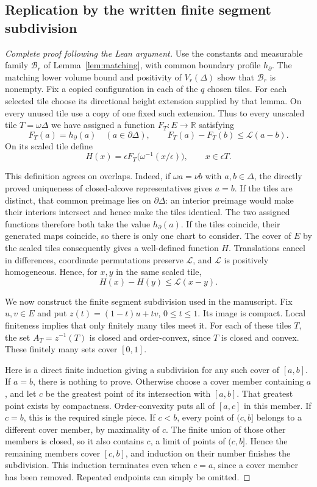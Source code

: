 \subsection{Replication by the written finite segment subdivision}
\label{leanproof:ANT-5-3}
\begin{proof}[Complete proof following the Lean argument]
Use the constants and measurable family \(\mathcal B_r\) of
Lemma~\ref{lem:matching}, with common boundary profile \(h_\partial\).
The matching lower volume bound and positivity of \(V_r(\Delta)\)
show that \(\mathcal B_r\) is nonempty.
Fix a copied configuration in each of the \(q\) chosen tiles.
For each selected tile choose its directional height extension supplied
by that lemma. On every unused tile use a copy of one fixed such extension.
Thus to every unscaled tile \(T=\omega\Delta\) we have assigned a function
\(F_T:E\to\mathbb R\) satisfying
\[
       F_T(a)=h_\partial(a)\quad(a\in\partial\Delta),
       \qquad
       F_T(a)-F_T(b)\le\mathcal L(a-b).
\]
On its scaled tile define
\[
       H(x)=\epsilon F_T\bigl(\omega^{-1}(x/\epsilon)\bigr),
                   \qquad x\in\epsilon T.
\]

This definition agrees on overlaps.
Indeed, if \(\omega a=\nu b\) with \(a,b\in\Delta\),
the directly proved uniqueness of closed-alcove representatives gives
\(a=b\).
If the tiles are distinct, that common preimage lies on \(\partial\Delta\):
an interior preimage would make their interiors intersect and hence make
the tiles identical.
The two assigned functions therefore both take the value \(h_\partial(a)\).
If the tiles coincide, their generated maps coincide, so there is
only one chart to consider.
The cover of \(E\) by the scaled tiles consequently gives a well-defined
function \(H\).
Translations cancel in differences, coordinate permutations preserve
\(\mathcal L\), and \(\mathcal L\) is positively homogeneous.
Hence, for \(x,y\) in the same scaled tile,
\[
                  H(x)-H(y)\le\mathcal L(x-y).
\]

We now construct the finite segment subdivision used in the manuscript.
Fix \(u,v\in E\) and put \(z(t)=(1-t)u+tv\), \(0\le t\le1\).
Its image is compact. Local finiteness implies that only finitely many
tiles meet it. For each of these tiles \(T\), the set
\(A_T=z^{-1}(T)\) is closed and order-convex, since \(T\) is closed and
convex. These finitely many sets cover \([0,1]\).

Here is a direct finite induction giving a subdivision for any such
cover of \([a,b]\). If \(a=b\), there is nothing to prove. Otherwise
choose a cover member containing \(a\), and let \(c\) be the greatest
point of its intersection with \([a,b]\). That greatest point exists
by compactness. Order-convexity puts all of \([a,c]\) in this member.
If \(c=b\), this is the required single piece. If \(c<b\), every
point of \((c,b]\) belongs to a different cover member, by maximality
of \(c\). The finite union of those other members is closed, so it
also contains \(c\), a limit of points of \((c,b]\). Hence the
remaining members cover \([c,b]\), and induction on their number
finishes the subdivision. This induction terminates even when
\(c=a\), since a cover member has been removed. Repeated endpoints
can simply be omitted.


\end{proof}
